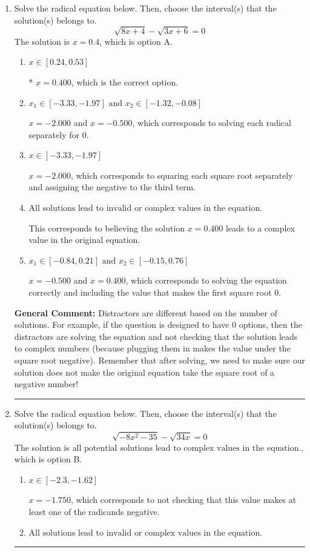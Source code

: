 \documentclass{extbook}[14pt]
\newcommand{\litem}[1]{\item #1

\rule{\textwidth}{0.4pt}}
\begin{document}
\begin{enumerate}\litem{
Solve the radical equation below. Then, choose the interval(s) that the solution(s) belongs to.
\[ \sqrt{8 x + 4} - \sqrt{3 x + 6} = 0 \]
The solution is \( x = 0.4 \), which is option A.\begin{enumerate}[label=\Alph*.]
\item \( x \in [0.24,0.53] \)

* $x = 0.400$, which is the correct option.
\item \( x_1 \in [-3.33, -1.97] \text{ and } x_2 \in [-1.32,-0.08] \)

$x = -2.000$ and $x = -0.500$, which corresponds to solving each radical separately for 0.
\item \( x \in [-3.33,-1.97] \)

$x = -2.000$, which corresponds to squaring each square root separately and assigning the negative to the third term.
\item \( \text{All solutions lead to invalid or complex values in the equation.} \)

This corresponds to believing the solution $x = 0.400$ leads to a complex value in the original equation.
\item \( x_1 \in [-0.84, 0.21] \text{ and } x_2 \in [-0.15,0.76] \)

$x = -0.500$ and $x = 0.400$, which corresponds to solving the equation correctly and including the value that makes the first square root 0.
\end{enumerate}

\textbf{General Comment:} Distractors are different based on the number of solutions. For example, if the question is designed to have 0 options, then the distractors are solving the equation and not checking that the solution leads to complex numbers (because plugging them in makes the value under the square root negative). Remember that after solving, we need to make sure our solution does not make the original equation take the square root of a negative number!
}
\litem{
Solve the radical equation below. Then, choose the interval(s) that the solution(s) belongs to.
\[ \sqrt{-8 x^2 - 35} - \sqrt{34 x} = 0 \]
The solution is \( \text{all potential solutions lead to complex values in the equation.} \), which is option B.\begin{enumerate}[label=\Alph*.]
\item \( x \in [-2.3,-1.62] \)

$x = -1.750$, which corresponds to not checking that this value makes at least one of the radicands negative.
\item \( \text{All solutions lead to invalid or complex values in the equation.} \)


\end{enumerate}}
\end{enumerate}
\end{document}
